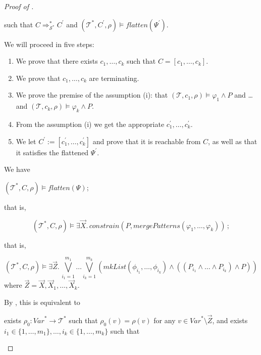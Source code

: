 \documentclass{article}
\newenvironment{proofenv}
  {
    \VerbatimEnvironment\begin{tcolorbox}[colback=black!0!white] %
  }
  {
   \end{tcolorbox}
  }
\begin{document}
\begin{proof}[Proof of ]
\begin{enumerate}
\begin{proofenv}
    such that
    $C \Rightarrow^{*}_{\mathcal{S}^*} C^\prime$
    and $(\mathcal{T}^*, C^\prime, \rho) \vDash \mathit{flatten}(\Psi^\prime)$.
    \end{proofenv}
    We will proceed in five steps:
    \begin{enumerate}
        \item We prove that there exists $c_1,\ldots,c_k$ such that $C = [c_1,\ldots, c_k]$.
        \item We prove that $c_1,\ldots,c_k$ are terminating.
        \item We prove the premise of the assumption (i): that $(\mathcal{T}, c_1, \rho) \vDash \varphi_1 \land P$
        and \ldots and $(\mathcal{T}, c_k, \rho) \vDash \varphi_k \land P$.
        \item From the assumption (i) we get the appropriate $c_1^\prime,\ldots,c_k^\prime$.
        \item We let $C^\prime := [c_1^\prime,\ldots,c_k^\prime]$ and prove that it is reachable from $C$,
        as well as that it satisfies the flattened $\Psi^\prime$.
    \end{enumerate}
    We have
    \begin{proofenv}
    $(\mathcal{T}^*, C, \rho) \vDash \mathit{flatten}(\Psi)$;
    \end{proofenv}
    that is,
    \begin{proofenv}
    \begin{equation*}
     (\mathcal{T}^*, C, \rho) \vDash \exists \vec{X}.\, \mathit{constrain}(P, \mathit{mergePatterns}(\varphi_1,\ldots,\varphi_k))    \, ;
    \end{equation*}
    \end{proofenv}
    that is,
    \begin{proofenv}
    \begin{equation*}
     (\mathcal{T}^*, C, \rho) \vDash \exists \vec{Z}.\, \bigvee_{i_1 = 1}^{m_1} \ldots \bigvee_{i_k = 1}^{m_k} (
    \mathit{mkList}(\phi_{i_1}, \ldots, \phi_{i_k}) \land ((P_{i_1} \land \ldots \land P_{i_k}) \land P) )
    \end{equation*}
    where $\mathit{\vec{Z}} = \vec{X},\vec{X}_1,\ldots,\vec{X}_k$.
    \end{proofenv}
    By , this is equivalent to
    \begin{proofenv}
    exists $\rho_0 : \mathit{Var}^* \to \mathcal{T}^*$ such that $\rho_0(v) = \rho(v)$ for any $v \in \mathit{Var}^* \setminus \vec{Z}$, and exists $i_1 \in \{ 1, \ldots, m_1 \}, \ldots, i_k \in \{ 1, \ldots, m_k \}$ such that

\end{proofenv}
\end{enumerate}
\end{proof}
\end{document}
